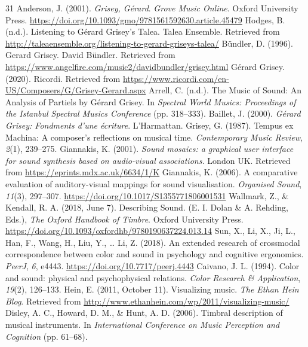 \documentclass[sigconf]{nimeart}
\begin{document}
\begin{thebibliography}{31}
 {{ }}  Anderson, J. (2001). \emph{Grisey, Gérard}. \emph{Grove Music Online}. Oxford University Press. \url{https://doi.org/10.1093/gmo/9781561592630.article.45479}{}
 {{ }}  Hodges, B. (n.d.). Listening to Gérard Grisey's Talea. Talea Ensemble. Retrieved from \url{http://taleaensemble.org/listening-to-gerard-griseys-talea/}{}
 {{ }}  Bündler, D. (1996). Gerard Grisey. David Bündler. Retrieved from \url{https://www.angelfire.com/music2/davidbundler/grisey.html}{}
 {{ }}  Gérard Grisey. (2020). Ricordi. Retrieved from \url{https://www.ricordi.com/en-US/Composers/G/Grisey-Gerard.aspx}{}
 {{ }}  Arrell, C. (n.d.). The Music of Sound: An Analysis of Partiels by Gérard Grisey. In \emph{Spectral World Musics: Proceedings of the Istanbul Spectral Musics Conference} (pp. 318--333).{}
 {{ }}  Baillet, J. (2000). \emph{Gérard Grisey: Fondments d'une écriture}. L'Harmattan.{}
 {{ }}  Grisey, G. (1987). Tempus ex Machina: A composer's reflections on musical time. \emph{Contemporary Music Review}, \emph{2}(1), 239--275.{}
 {{ }}  Giannakis, K. (2001). \emph{Sound mosaics: a graphical user interface for sound synthesis based on audio-visual associations.} London UK. Retrieved from \url{https://eprints.mdx.ac.uk/6634/1/K}{}
 {{ }}  Giannakis, K. (2006). A comparative evaluation of auditory-visual mappings for sound visualisation. \emph{Organised Sound}, \emph{11}(3), 297--307. \url{https://doi.org/10.1017/S1355771806001531}{}
 {{ }}  Wallmark, Z., \& Kendall, R. A. (2018, June 7). Describing Sound. (E. I. Dolan \& A. Rehding, Eds.), \emph{The Oxford Handbook of Timbre}. Oxford University Press. \url{https://doi.org/10.1093/oxfordhb/9780190637224.013.14}{}
 {{ }}  Sun, X., Li, X., Ji, L., Han, F., Wang, H., Liu, Y., \ldots{} Li, Z. (2018). An extended research of crossmodal correspondence between color and sound in psychology and cognitive ergonomics. \emph{PeerJ}, \emph{6}, e4443. \url{https://doi.org/10.7717/peerj.4443}{}
 {{ }}  Caivano, J. L. (1994). Color and sound: physical and psychophysical relations. \emph{Color Research \& Application}, \emph{19}(2), 126--133.{}
 {{ }}  Hein, E. (2011, October 11). Visualizing music. \emph{The Ethan Hein Blog}. Retrieved from \url{http://www.ethanhein.com/wp/2011/visualizing-music/}{}
 {{ }}  Disley, A. C., Howard, D. M., \& Hunt, A. D. (2006). Timbral description of musical instruments. In \emph{International Conference on Music Perception and Cognition} (pp. 61--68).{}

\end{thebibliography}
\end{document}
